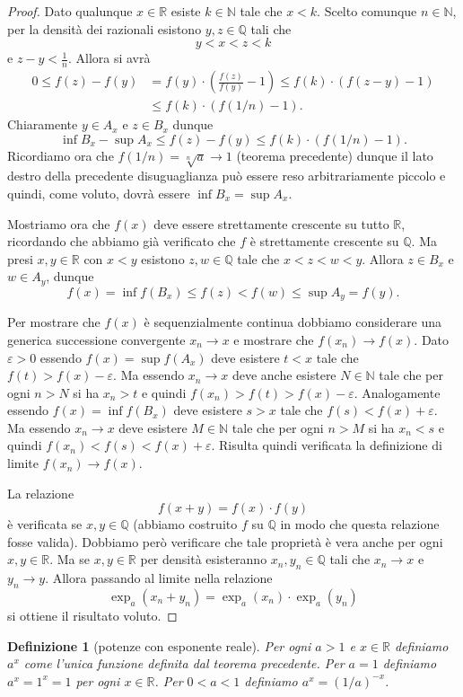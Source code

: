\documentclass[italian,a4paper,oneside,headinclude]{scrbook}
\newcommand{\eps}{\varepsilon}
\newcommand{\NN}{\mathbb N}
\newcommand{\QQ}{\mathbb Q}
\newcommand{\RR}{\mathbb R}
\newcommand{\enclose}[1]{{\left( #1 \right)}}
\newtheorem{definition}[theorem]{Definizione}
\begin{document}
\begin{proof}
Dato qualunque $x\in \RR$ esiste $k\in \NN$ tale che $x < k$.
Scelto comunque $n \in \NN$, per la densità dei razionali
esistono $y,z\in \QQ$ tali che
\[
  y < x < z < k
\]
e $z-y< \frac 1 n$. Allora si avrà
\begin{align*}
  0 \le f(z) - f(y)
  &= f(y)\cdot\enclose{\frac{f(z)}{f(y)}-1}
  \le f(k)\cdot \enclose{f(z-y)-1}\\
  &\le f(k)\cdot \enclose{f(1/n)-1}.
\end{align*}
Chiaramente $y\in A_x$ e $z\in B_x$ dunque
\[
\inf B_x - \sup A_x \le f(z) - f(y) \le f(k) \cdot (f(1/n)-1).
\]
Ricordiamo ora che $f(1/n) = \sqrt[n]{a} \to 1$ (teorema precedente)
dunque il lato destro della precedente disuguaglianza può essere reso
arbitrariamente piccolo e quindi, come voluto,
dovrà essere $\inf B_x = \sup A_x$.

Mostriamo ora che $f(x)$ deve essere strettamente crescente su tutto $\RR$,
ricordando
che abbiamo già verificato che $f$ è strettamente crescente su $\QQ$.
Ma presi $x,y\in \RR$ con $x<y$ esistono $z,w\in \QQ$ tale che $x<z<w<y$.
Allora $z\in B_x$ e $w\in A_y$, dunque
\[
  f(x) = \inf f(B_x) \le f(z) < f(w) \le \sup A_y = f(y).
\]

Per mostrare che $f(x)$ è sequenzialmente continua dobbiamo
considerare una generica successione convergente $x_n \to x$
e mostrare che $f(x_n)\to f(x)$.
Dato $\eps>0$ essendo $f(x) = \sup f(A_x)$ deve esistere $t<x$
tale che $f(t) > f(x) -\eps$. Ma essendo $x_n\to x$ deve anche
esistere $N\in \NN$ tale che per ogni $n>N$ si ha $x_n>t$ e quindi
$f(x_n) > f(t) > f(x) -\eps$.
Analogamente essendo $f(x) = \inf f(B_x)$ deve esistere $s>x$
tale che $f(s) < f(x) + \eps$. Ma essendo $x_n\to x$ deve
esistere $M\in \NN$ tale che per ogni $n>M$ si ha $x_n<s$
e quindi $f(x_n) < f(s) < f(x) + \eps$. Risulta quindi
verificata la definizione di limite $f(x_n)\to f(x)$.

La relazione
\[
  f(x+y) = f(x) \cdot f(y)
\]
è verificata se $x,y \in \QQ$ (abbiamo costruito $f$ su $\QQ$ in modo
che questa relazione fosse valida).
Dobbiamo però verificare che tale proprietà è vera anche per ogni $x,y \in \RR$.
Ma se $x,y \in \RR$ per densità esisteranno $x_n, y_n\in \QQ$ tali
che $x_n\to x$ e $y_n\to y$. Allora passando al limite
nella relazione
\[
  \exp_a(x_n+y_n) = \exp_a(x_n)\cdot \exp_a(y_n)
\]
si ottiene il risultato voluto.
\end{proof}

\begin{definition}[potenze con esponente reale]
Per ogni $a>1$ e $x\in \RR$ definiamo $a^x$ come
l'unica funzione definita dal teorema precedente.
Per $a=1$ definiamo $a^x = 1^x = 1$ per ogni $x\in \RR$.
Per $0<a<1$ definiamo $a^x = (1/a)^{-x}$.
\end{definition}
\end{document}
